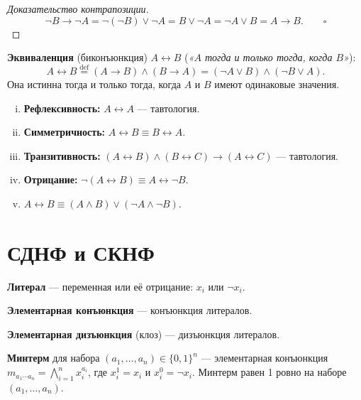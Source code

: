 \documentclass[12pt]{article}
\begin{document}
\begin{proof}[Доказательство контрапозиции]
\[
\neg B \to \neg A
= \neg(\neg B) \vee \neg A
= B \vee \neg A
= \neg A \vee B
= A \to B. \qquad \square
\]
\end{proof}

\begin{definition}
\textbf{Эквиваленция} (биконъюнкция) $A \leftrightarrow B$
(\emph{«$A$ тогда и только тогда, когда $B$»}):
\[
A \leftrightarrow B \stackrel{\mathrm{def}}{=}
(A \to B) \wedge (B \to A)
= (\neg A \vee B) \wedge (\neg B \vee A).
\]
Она истинна тогда и только тогда, когда $A$ и $B$ имеют одинаковые
значения.
\end{definition}

\begin{property}
\begin{enumerate}[(i)]
\item \textbf{Рефлексивность:} $A \leftrightarrow A$ --- тавтология.
\item \textbf{Симметричность:} $A \leftrightarrow B \equiv B \leftrightarrow A$.
\item \textbf{Транзитивность:}
      $(A \leftrightarrow B) \wedge (B \leftrightarrow C) \to
       (A \leftrightarrow C)$ --- тавтология.
\item \textbf{Отрицание:}
      $\neg(A \leftrightarrow B) \equiv A \leftrightarrow \neg B$.
\item $A \leftrightarrow B \equiv (A \wedge B) \vee (\neg A \wedge \neg B)$.
\end{enumerate}
\end{property}

\section{СДНФ и СКНФ}

\begin{definition}
\textbf{Литерал} --- переменная или её отрицание: $x_i$ или $\neg x_i$.

\textbf{Элементарная конъюнкция} --- конъюнкция литералов.

\textbf{Элементарная дизъюнкция} (клоз) --- дизъюнкция литералов.
\end{definition}

\begin{definition}
\textbf{Минтерм} для набора $(a_1,\ldots,a_n) \in \{0,1\}^n$ ---
элементарная конъюнкция $\displaystyle m_{a_1\cdots a_n} =
\bigwedge_{i=1}^n x_i^{a_i}$,
где $x_i^1 = x_i$ и $x_i^0 = \neg x_i$.
Минтерм равен 1 ровно на наборе $(a_1,\ldots,a_n)$.
\end{definition}
\end{document}

